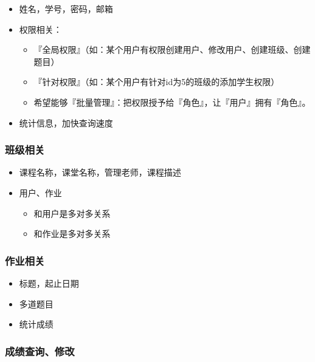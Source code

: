 \documentclass{ctexrep}
\begin{document}
\begin{itemize}
\item
  姓名，学号，密码，邮箱
\item
  权限相关：

  \begin{itemize}
  \item
    『全局权限』（如：某个用户有权限创建用户、修改用户、创建班级、创建题目）
  \item
    『针对权限』（如：某个用户有针对id为5的班级的添加学生权限）
  \item
    希望能够『批量管理』：把权限授予给『角色』，让『用户』拥有『角色』。
  \end{itemize}
\item
  统计信息，加快查询速度
\end{itemize}

\subsubsection{班级相关}

\begin{itemize}
\item
  课程名称，课堂名称，管理老师，课程描述
\item
  用户、作业

  \begin{itemize}
  \item
    和用户是多对多关系
  \item
    和作业是多对多关系
  \end{itemize}
\end{itemize}

\hypertarget{ux4f5cux4e1aux76f8ux5173}{%
\subsubsection{作业相关}\label{ux4f5cux4e1aux76f8ux5173}}

\begin{itemize}
\item
  标题，起止日期
\item
  多道题目
\item
  统计成绩
\end{itemize}

\hypertarget{ux6210ux7ee9ux67e5ux8be2ux4feeux6539}{%
\subsubsection{成绩查询、修改}\label{ux6210ux7ee9ux67e5ux8be2ux4feeux6539}}
\end{document}
